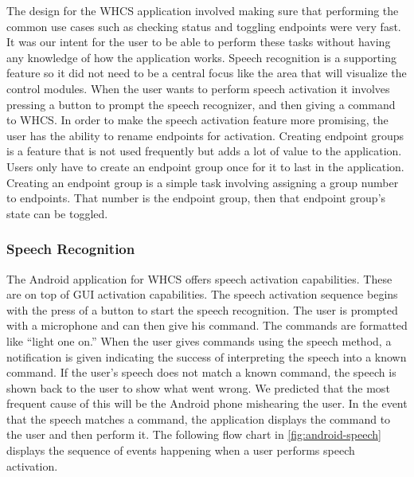 The design for the WHCS application involved making sure that performing the
common use cases such as checking status and toggling endpoints were very fast.
It was our intent for the user to be able to perform these tasks without having any knowledge of
how the application works. Speech recognition is a supporting feature so
it did not need to be a central focus like the area that will visualize the
control modules. When the user wants to perform speech activation it 
involves pressing a button to prompt the speech recognizer, and then giving a
command to WHCS. In order to make the speech activation feature more
promising, the user has the ability to rename endpoints for activation.
Creating endpoint groups is a feature that is not used frequently but adds
a lot of value to the application. Users only have to create an endpoint
group once for it to last in the application. Creating an endpoint group is a simple task involving assigning a group number to endpoints. That number
is the endpoint group, then that endpoint group's state can be toggled.


\subsubsection{Speech Recognition} The Android application for WHCS offers
speech activation capabilities. These are on top of GUI activation
capabilities. The speech activation sequence begins with the press of a button
to start the speech recognition. The user is prompted with a microphone
and can then give his command. The commands are formatted like {}``light
one on.'' When the user gives commands using the speech method, a notification
is given indicating the success of interpreting the speech into a known
command. If the user{}'s speech does not match a known command, the speech is  shown back to the user to show what went wrong. We predicted that the
most frequent cause of this will be the Android phone mishearing the user. In
the event that the speech matches a command, the application displays the
command to the user and then perform it. The following flow chart in
\autoref{fig:android-speech} displays the sequence of events happening when a
user performs speech activation.


